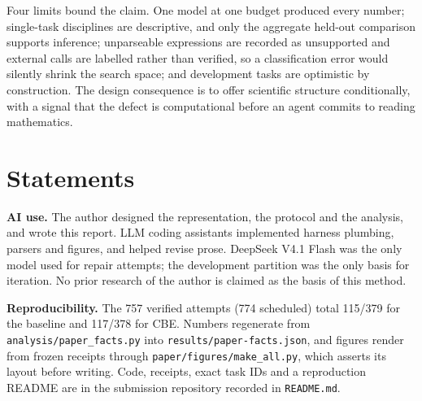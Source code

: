 \documentclass[10pt]{article}
\begin{document}
Four limits bound the claim. One model at one budget produced every number; single-task disciplines are
descriptive, and only the aggregate held-out comparison supports inference; unparseable expressions are
recorded as unsupported and external calls are labelled rather than verified, so a classification error
would silently shrink the search space; and development tasks are optimistic by construction. The design
consequence is to offer scientific structure conditionally, with a signal that the defect is computational
before an agent commits to reading mathematics.

\clearpage
\section*{Statements}
\textbf{AI use.} The author designed the representation, the protocol and the analysis, and wrote this
report. LLM coding assistants implemented harness plumbing, parsers and figures, and helped revise prose.
DeepSeek V4.1 Flash was the only model used for repair attempts; the development partition was the only
basis for iteration. No prior research of the author is claimed as the basis of this method.

\textbf{Reproducibility.} The 757 verified attempts (774 scheduled) total 115/379 for the baseline and
117/378 for CBE. Numbers regenerate from \texttt{analysis/paper\_facts.py} into
\texttt{results/paper-facts.json}, and figures render from frozen receipts through
\texttt{paper/figures/make\_all.py}, which asserts its layout before writing. Code, receipts, exact task
IDs and a reproduction README are in the submission repository recorded in \texttt{README.md}.
\end{document}
